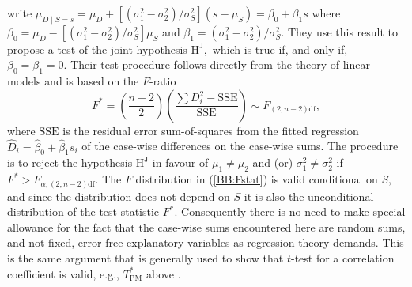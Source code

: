 \cite{BradBlack89} write $\mu_{D \mid S=s} = \mu_D + [ ( \sigma^2_1 - \sigma^2_2) / \sigma^2_S ] (s - \mu_S) = \beta_0 + \beta_1 s$ where $\beta_0=\mu_D- [(\sigma^2_1-\sigma^2_2)/ \sigma^2_S] \mu_S$ and $\beta_1 = (\sigma^2_1 - \sigma^2_2 )/ \sigma^2_S.$ They use this result to propose a test of the joint hypothesis $\textrm{H}^\mathrm{J},$ which is true if, and only if, $\beta_0=\beta_1=0.$ Their test procedure follows directly from the theory of linear models \citep[for example]{Hogg} and is based on the $F$-ratio
\begin{equation}\label{BB:Fstat}
F^* = (\frac{n-2}{2}) (\frac{\sum {D_i^2} - \mathrm{SSE}}{\mathrm{SSE}}) \sim F_{(2,n-2)\textrm{df}} ,
\end{equation}
where $\mathrm{SSE}$ is the residual error sum-of-squares from the fitted regression $\hat{D}_i=\hat{\beta}_0 +\hat{\beta}_1 s_i$ of the case-wise differences on the case-wise sums. The procedure is to reject the hypothesis $\textrm{H}^\mathrm{J}$ in favour of $\mu_1\neq\mu_2$ and (or) $\sigma^2_1\neq\sigma^2_2$ if $F^* >  F_{\alpha,(2,n-2)\textrm{df}}.$ The $F$ distribution in (\ref{BB:Fstat}) is valid conditional on $S,$ and since the distribution does not depend on $S$ it is also the unconditional distribution of the test statistic $F^*.$ Consequently there is no need to make special allowance for the fact that the case-wise sums encountered here are random sums, and not fixed, error-free explanatory variables as regression theory demands.   This is the same argument that is generally used to show that $t$-test for a correlation coefficient is valid, e.g., $T^*_\mathrm{PM}$ above \citep[page 499]{Hogg}.
